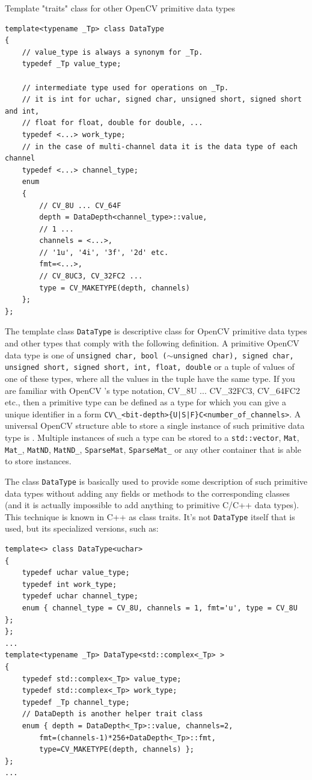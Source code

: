 \label{DataType}
Template "traits" class for other OpenCV primitive data types

\begin{lstlisting}
template<typename _Tp> class DataType
{
    // value_type is always a synonym for _Tp.
    typedef _Tp value_type;
    
    // intermediate type used for operations on _Tp.
    // it is int for uchar, signed char, unsigned short, signed short and int,
    // float for float, double for double, ...
    typedef <...> work_type;
    // in the case of multi-channel data it is the data type of each channel
    typedef <...> channel_type;
    enum
    {
        // CV_8U ... CV_64F
        depth = DataDepth<channel_type>::value,
        // 1 ... 
        channels = <...>,
        // '1u', '4i', '3f', '2d' etc.
        fmt=<...>,
        // CV_8UC3, CV_32FC2 ...
        type = CV_MAKETYPE(depth, channels)
    };
};
\end{lstlisting}

The template class \texttt{DataType} is descriptive class for OpenCV primitive data types and other types that comply with the following definition. A primitive OpenCV data type is one of \texttt{unsigned char, bool ($\sim$unsigned char), signed char, unsigned short, signed short, int, float, double} or a tuple of values of one of these types, where all the values in the tuple have the same type. If you are familiar with OpenCV 's type notation, CV\_8U ... CV\_32FC3, CV\_64FC2 etc., then a primitive type can be defined as a type for which you can give a unique identifier in a form \verb*"CV\_<bit-depth>{U|S|F}C<number_of_channels>". A universal OpenCV structure able to store a single instance of such primitive data type is . Multiple instances of such a type can be stored to a \texttt{std::vector}, \texttt{Mat}, \texttt{Mat\_}, \texttt{MatND}, \texttt{MatND\_}, \texttt{SparseMat}, \texttt{SparseMat\_} or any other container that is able to store  instances.
 
The class \texttt{DataType} is basically used to provide some description of such primitive data types without adding any fields or methods to the corresponding classes (and it is actually impossible to add anything to primitive C/C++ data types). This technique is known in C++ as class traits. It's not \texttt{DataType} itself that is used, but its specialized versions, such as:

\begin{lstlisting}
template<> class DataType<uchar>
{
    typedef uchar value_type;
    typedef int work_type;
    typedef uchar channel_type;
    enum { channel_type = CV_8U, channels = 1, fmt='u', type = CV_8U };
};
...
template<typename _Tp> DataType<std::complex<_Tp> >
{
    typedef std::complex<_Tp> value_type;
    typedef std::complex<_Tp> work_type;
    typedef _Tp channel_type;
    // DataDepth is another helper trait class
    enum { depth = DataDepth<_Tp>::value, channels=2,
        fmt=(channels-1)*256+DataDepth<_Tp>::fmt,
        type=CV_MAKETYPE(depth, channels) };
};
...
\end{lstlisting}

